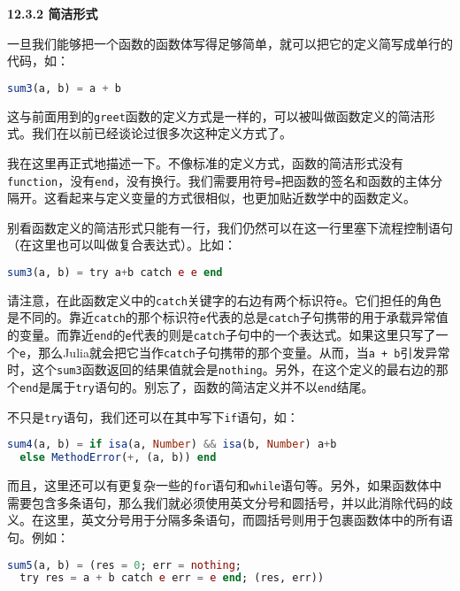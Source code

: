 \textbf{12.3.2 简洁形式}

一旦我们能够把一个函数的函数体写得足够简单，就可以把它的定义简写成单行的代码，如：

\begin{lstlisting}[language=julia]
sum3(a, b) = a + b
\end{lstlisting}

这与前面用到的\verb`greet`函数的定义方式是一样的，可以被叫做函数定义的简洁形式。我们在以前已经谈论过很多次这种定义方式了。
 
我在这里再正式地描述一下。不像标准的定义方式，函数的简洁形式没有\verb`function`，没有\verb`end`，没有换行。我们需要用符号\verb`=`把函数的签名和函数的主体分隔开。这看起来与定义变量的方式很相似，也更加贴近数学中的函数定义。

别看函数定义的简洁形式只能有一行，我们仍然可以在这一行里塞下流程控制语句（在这里也可以叫做复合表达式）。比如：

\begin{lstlisting}[language=julia]
sum3(a, b) = try a+b catch e e end
\end{lstlisting}

请注意，在此函数定义中的\verb`catch`关键字的右边有两个标识符\verb`e`。它们担任的角色是不同的。靠近\verb`catch`的那个标识符\verb`e`代表的总是\verb`catch`子句携带的用于承载异常值的变量。而靠近\verb`end`的\verb`e`代表的则是\verb`catch`子句中的一个表达式。如果这里只写了一个\verb`e`，那么Julia就会把它当作\verb`catch`子句携带的那个变量。从而，当\verb`a + b`引发异常时，这个\verb`sum3`函数返回的结果值就会是\verb`nothing`。另外，在这个定义的最右边的那个\verb`end`是属于\verb`try`语句的。别忘了，函数的简洁定义并不以\verb`end`结尾。

不只是\verb`try`语句，我们还可以在其中写下\verb`if`语句，如：

\begin{lstlisting}[language=julia]
sum4(a, b) = if isa(a, Number) && isa(b, Number) a+b
  else MethodError(+, (a, b)) end 
\end{lstlisting}

而且，这里还可以有更复杂一些的\verb`for`语句和\verb`while`语句等。另外，如果函数体中需要包含多条语句，那么我们就必须使用英文分号和圆括号，并以此消除代码的歧义。在这里，英文分号用于分隔多条语句，而圆括号则用于包裹函数体中的所有语句。例如：

\begin{lstlisting}[language=julia]
sum5(a, b) = (res = 0; err = nothing;
  try res = a + b catch e err = e end; (res, err))
\end{lstlisting}

